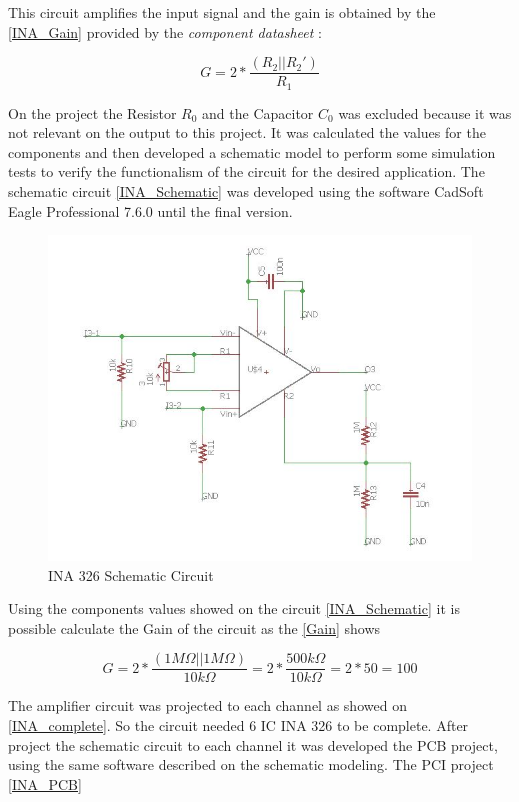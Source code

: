 This circuit amplifies the input signal and the gain is obtained by the \autoref{INA_Gain} provided by the \textit{component datasheet}
\cite{INA326}:

\begin{equation}
\label{INA_Gain}
G=2*\frac{(R_2||R_2 ')}{R_1}
\end{equation}

On the project the Resistor $R_0$ and the Capacitor $C_0$ was excluded because
it was not relevant on the output to this project. It was calculated the values
for the components and then developed a schematic model to perform some simulation tests
to verify the functionalism of the circuit for the desired application.
The schematic circuit \autoref{INA_Schematic} was developed using the software CadSoft Eagle Professional 7.6.0
until the final version.

\begin{figure}[!htpb]
\centering
\caption{INA 326 Schematic Circuit}
\label{INA_Schematic}
\includegraphics[scale=0.65]{images/INA_Schematic}
\end{figure}

Using the components values showed on the circuit \autoref{INA_Schematic} it is possible calculate
the Gain of the circuit as the \autoref{Gain} shows

\begin{equation}
  \label{Gain}
G=2*\frac{(1M\Omega||1M\Omega)}{10k\Omega}
=2*\frac{500k\Omega}{10k\Omega}
=2*50
=100
\end{equation}

The amplifier circuit was projected to each channel as showed on \autoref{INA_complete}.
So the circuit needed 6 IC INA 326 to be complete.  After project
the schematic circuit to each channel it was developed the PCB project, using the
same software described on the schematic modeling. The PCI project \autoref{INA_PCB}\\

